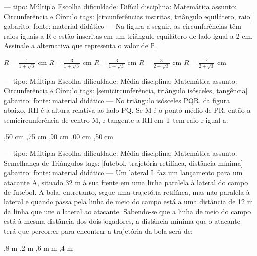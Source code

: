 ---
tipo: Múltipla Escolha
dificuldade: Difícil
disciplina: Matemática
assunto: Circunferência e Círculo
tags: [circunferências inscritas, triângulo equilátero, raio]
gabarito:
fonte: material didático
---
\question
Na figura a seguir, as circunferências têm raios iguais a R e estão inscritas em um triângulo equilátero de lado igual a 2 cm.
Assinale a alternativa que representa o valor de R.
\begin{choices}
\choice $R = \frac{1}{1+\sqrt{3}}$ cm
\choice $R = \frac{3}{1+\sqrt{3}}$ cm
\choice $R = \frac{3}{1+\sqrt{3}}$ cm
\choice $R = \frac{3}{2+\sqrt{3}}$ cm
\choice $R = \frac{2}{2+\sqrt{3}}$ cm
\end{choices}


---
tipo: Múltipla Escolha
dificuldade: Média
disciplina: Matemática
assunto: Circunferência e Círculo
tags: [semicircunferência, triângulo isósceles, tangência]
gabarito:
fonte: material didático
---
\question
No triângulo isósceles PQR, da figura abaixo, RH é a altura relativa ao lado PQ.
Se M é o ponto médio de PR, então a semicircunferência de centro M, e tangente a RH em T tem raio r igual a:
\begin{choices}
,50 cm
,75 cm
,90 cm
,00 cm
,50 cm
\end{choices}


---
tipo: Múltipla Escolha
dificuldade: Média
disciplina: Matemática
assunto: Semelhança de Triângulos
tags: [futebol, trajetória retilínea, distância mínima]
gabarito:
fonte: material didático
---
\question
Um lateral L faz um lançamento para um atacante A, situado 32 m à sua frente em uma linha paralela à lateral do campo de futebol. A bola, entretanto, segue uma trajetória retilínea, mas não paralela à lateral e quando passa pela linha de meio do campo está a uma distância de 12 m da linha que une o lateral ao atacante. Sabendo-se que a linha de meio do campo está à mesma distância dos dois jogadores, a distância mínima que o atacante terá que percorrer para encontrar a trajetória da bola será de:
\begin{choices}
,8 m
,2 m
,6 m
 m
,4 m
\end{choices}


